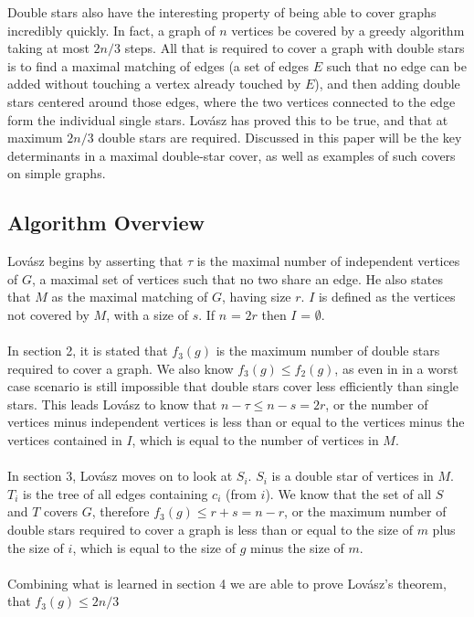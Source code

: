 \documentclass{article}
\begin{document}
	Double stars also have the interesting property of being able to cover graphs incredibly quickly. In fact, a graph of $n$ vertices be covered by a greedy algorithm taking at most $2n/3$ steps. All that is required to cover a graph with double stars is to find a maximal matching of edges (a set of edges $E$ such that no edge can be added without touching a vertex already touched by $E$), and then adding double stars centered around those edges, where the two vertices connected to the edge form the individual single stars. Lov\'asz has proved this to be true, and that at maximum $2n/3$ double stars are required. Discussed in this paper will be the key determinants in a maximal double-star cover, as well as examples of such covers on simple graphs.
	\subsection{Algorithm Overview}
	
	Lov\'asz begins by asserting that $\tau$ is the maximal number of independent vertices of $G$, a maximal set of vertices such that no two share an edge. He also states that $M$ as the maximal matching of $G$, having size $r$. $I$ is defined as the vertices not covered by $M$, with a size of $s$. If $n$ = $2r$ then $I$ = $\emptyset$.
	\\\\
	In section 2, it is stated that $f_{3}(g)$ is the maximum number of double stars required to cover a graph. We also know $f_{3}(g) \leq f_{2}(g)$, as even in in a worst case scenario is still impossible that double stars cover less efficiently than single stars. This leads Lov\'asz to know that $n-\tau \leq n-s = 2r$, or the number of vertices minus independent vertices is less than or equal to the vertices minus the vertices contained in $I$, which is equal to the number of vertices in $M$.
	\\\\
	In section 3, Lov\'asz moves on to look at $S_{i}$. $S_{i}$ is a double star of vertices in $M$. $T_{i}$ is the tree of all edges containing $c_{i}$ (from $i$). We know that the set of all $S$ and $T$ covers $G$, therefore $f_{3}(g) \leq r + s = n - r$, or the maximum number of double stars required to cover a graph is less than or equal to the size of $m$ plus the size of $i$, which is equal to the size of $g$ minus the size of $m$.
	\\\\
	Combining what is learned in section 4 we are able to prove Lov\'asz's theorem, that $f_{3}(g) \leq 2n/3$
	
\end{document}
